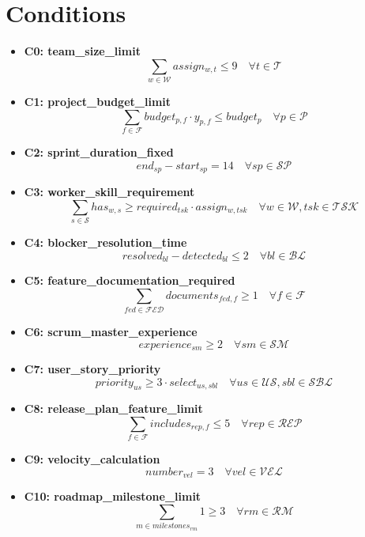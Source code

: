 \documentclass{article}
\begin{document}
\section{Conditions}
\begin{itemize}
    \item \textbf{C0: team\_size\_limit}
    \[
    \sum_{w \in \mathcal{W}} assign_{w,t} \leq 9 \quad \forall t \in \mathcal{T}
    \]
    \item \textbf{C1: project\_budget\_limit}
    \[
    \sum_{f \in \mathcal{F}} budget_{p,f} \cdot y_{p,f} \leq budget_{p} \quad \forall p \in \mathcal{P}
    \]
    \item \textbf{C2: sprint\_duration\_fixed}
    \[
    end_{sp} - start_{sp} = 14 \quad \forall sp \in \mathcal{SP}
    \]
    \item \textbf{C3: worker\_skill\_requirement}
    \[
    \sum_{s \in \mathcal{S}} has_{w,s} \geq required_{tsk} \cdot assign_{w,tsk} \quad \forall w \in \mathcal{W}, tsk \in \mathcal{TSK}
    \]
    \item \textbf{C4: blocker\_resolution\_time}
    \[
    resolved_{bl} - detected_{bl} \leq 2 \quad \forall bl \in \mathcal{BL}
    \]
    \item \textbf{C5: feature\_documentation\_required}
    \[
    \sum_{fed \in \mathcal{FED}} documents_{fed,f} \geq 1 \quad \forall f \in \mathcal{F}
    \]
    \item \textbf{C6: scrum\_master\_experience}
    \[
    experience_{sm} \geq 2 \quad \forall sm \in \mathcal{SM}
    \]
    \item \textbf{C7: user\_story\_priority}
    \[
    priority_{us} \geq 3 \cdot select_{us,sbl} \quad \forall us \in \mathcal{US}, sbl \in \mathcal{SBL}
    \]
    \item \textbf{C8: release\_plan\_feature\_limit}
    \[
    \sum_{f \in \mathcal{F}} includes_{rep,f} \leq 5 \quad \forall rep \in \mathcal{REP}
    \]
    \item \textbf{C9: velocity\_calculation}
    \[
    number_{vel} = 3 \quad \forall vel \in \mathcal{VEL}
    \]
    \item \textbf{C10: roadmap\_milestone\_limit}
    \[
    \sum_{m \in milestones_{rm}} 1 \geq 3 \quad \forall rm \in \mathcal{RM}
    \]
\end{itemize}
\end{document}
